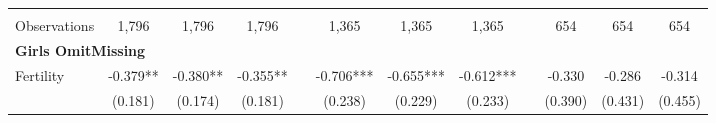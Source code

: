 \begin{landscape}
\begin{table}[htpb!]
\begin{center}
\begin{tabular}{lcccp{2mm}cccp{2mm}ccc}
\begin{footnotesize}\end{footnotesize}&\begin{footnotesize}\end{footnotesize}&\begin{footnotesize}\end{footnotesize}&\begin{footnotesize}\end{footnotesize}&\begin{footnotesize}\end{footnotesize}&\begin{footnotesize}\end{footnotesize}&\begin{footnotesize}\end{footnotesize}&\begin{footnotesize}\end{footnotesize}&\begin{footnotesize}\end{footnotesize}&\begin{footnotesize}\end{footnotesize}&\begin{footnotesize}\end{footnotesize}&\begin{footnotesize}\end{footnotesize}\\Observations&1,796&1,796&1,796&&1,365&1,365&1,365&&654&654&654\\
\multicolumn{12}{l}{\textbf{Girls OmitMissing}}\\ 
Fertility&-0.379**&-0.380**&-0.355**&&-0.706***&-0.655***&-0.612***&&-0.330&-0.286&-0.314\\
&(0.181)&(0.174)&(0.181)&&(0.238)&(0.229)&(0.233)&&(0.390)&(0.431)&(0.455)\\

\end{tabular}
\end{center}
\end{table}
\end{landscape}
